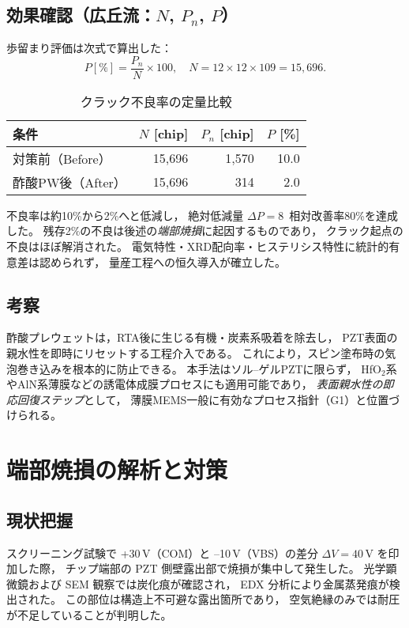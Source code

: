 \documentclass[conference]{IEEEtran}
\begin{document}
\subsection{効果確認（広丘流：$N$, $P_n$, $P$）}
歩留まり評価は次式で算出した：
\[
  P[\%] = \frac{P_n}{N} \times 100, \quad
  N = 12\times12\times109 = 15{,}696.
\]

\begin{table}[h]
  \centering
  \caption{クラック不良率の定量比較}
  \label{tab:crack-yield}
  \setlength{\tabcolsep}{4pt}
  \begin{tabular}{@{}lrrr@{}}
    \toprule
    条件 & $N$ [chip] & $P_n$ [chip] & $P$ [\%] \\
    \midrule
    対策前（Before） & 15{,}696 & 1{,}570 & 10.0 \\
    酢酸PW後（After） & 15{,}696 & 314 & 2.0 \\
    \bottomrule
  \end{tabular}
\end{table}

不良率は約10\%から2\%へと低減し，
絶対低減量 $\Delta P=8$\,%
相対改善率80\%を達成した。
残存2\%の不良は後述の\emph{端部焼損}に起因するものであり，
クラック起点の不良はほぼ解消された。
電気特性・XRD配向率・ヒステリシス特性に統計的有意差は認められず，
量産工程への恒久導入が確立した。

\subsection{考察}
酢酸プレウェットは，RTA後に生じる有機・炭素系吸着を除去し，
PZT表面の親水性を即時にリセットする工程介入である。
これにより，スピン塗布時の気泡巻き込みを根本的に防止できる。
本手法はソル–ゲルPZTに限らず，
HfO$_2$系やAlN系薄膜などの誘電体成膜プロセスにも適用可能であり，
\emph{表面親水性の即応回復ステップ}として，
薄膜MEMS一般に有効なプロセス指針（G1）と位置づけられる。

\section{端部焼損の解析と対策}
\label{sec:burnout}

\subsection{現状把握}
スクリーニング試験で +30\,V（COM）と --10\,V（VBS）の差分
$\Delta V = 40\,\mathrm{V}$ を印加した際，
チップ端部の PZT 側壁露出部で焼損が集中して発生した。
光学顕微鏡および SEM 観察では炭化痕が確認され，
EDX 分析により金属蒸発痕が検出された。
この部位は構造上不可避な露出箇所であり，
空気絶縁のみでは耐圧が不足していることが判明した。
\end{document}
